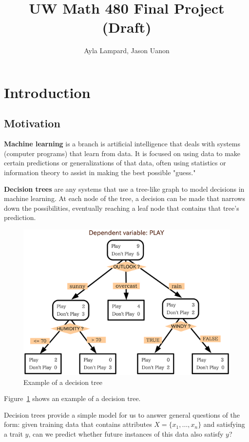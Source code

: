 \documentclass{article}
\title{UW Math 480 Final Project (Draft)}
\author{Ayla Lampard, Jason Uanon}
\begin{document}
\maketitle
\section{Introduction}

\subsection{Motivation}

\textbf{Machine learning} is a branch is artificial intelligence that deals with systems (computer programs) that learn from data. It is focused on using data to make certain predictions or generalizations of that data, often using statistics or information theory to assist in making the best possible "guess."

\textbf{Decision trees} are any systems that use a tree-like graph to model decisions in machine learning. At each node of the tree, a decision can be made that narrows down the possibilities, eventually reaching a leaf node that contains that tree's prediction.

\begin{figure}
    \centering
    \includegraphics[width=\textwidth]{figs/decision_tree.png}
    \caption{Example of a decision tree}
    \label{decision_tree}
\end{figure}

Figure~\ref{decision_tree} shows an example of a decision tree.

Decision trees provide a simple model for us to answer general questions of the form: given training data that contains attributes $X = \{x_1, \ldots, x_n\}$ and satisfying a trait $y$, can we predict whether future instances of this data also satisfy $y$?
\end{document}
